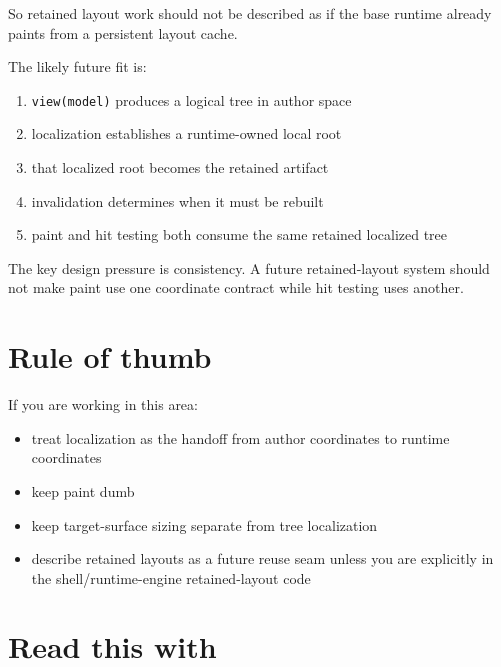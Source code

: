 So retained layout work should not be described as if the base runtime already paints from a persistent layout cache.

The likely future fit is:

\begin{enumerate}
\def\labelenumi{\arabic{enumi}.}
\tightlist
\item
  \texttt{v\allowbreak{}i\allowbreak{}e\allowbreak{}w\allowbreak{}(\allowbreak{}m\allowbreak{}o\allowbreak{}d\allowbreak{}e\allowbreak{}l\allowbreak{})} produces a logical tree in author space
\item
  localization establishes a runtime-owned local root
\item
  that localized root becomes the retained artifact
\item
  invalidation determines when it must be rebuilt
\item
  paint and hit testing both consume the same retained localized tree
\end{enumerate}

The key design pressure is consistency. A future retained-layout system should not make paint use one coordinate contract while hit testing uses another.

\section{Rule of thumb}\label{record-049-rule-of-thumb}

If you are working in this area:

\begin{itemize}
\tightlist
\item
  treat localization as the handoff from author coordinates to runtime coordinates
\item
  keep paint dumb
\item
  keep target-surface sizing separate from tree localization
\item
  describe retained layouts as a future reuse seam unless you are explicitly in the shell/runtime-engine retained-layout code
\end{itemize}

\section{Read this with}\label{record-049-read-this-with}

